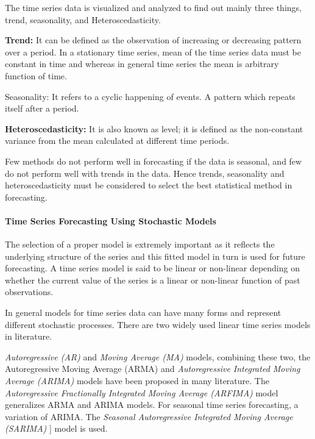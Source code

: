 \documentclass[
  letterpaper,
  DIV=11,
  numbers=noendperiod]{scrartcl}
\let\oldparagraph\paragraph
\renewcommand{\paragraph}[1]{\oldparagraph{#1}\mbox{}}
\begin{document}
The time series data is visualized and analyzed to find out mainly three
things, trend, seasonality, and Heteroscedasticity.

\textbf{Trend:} It can be defined as the observation of increasing or
decreasing pattern over a period. In a stationary time series, mean of
the time series data must be constant in time and whereas in general
time series the mean is arbitrary function of time.

Seasonality: It refers to a cyclic happening of events. A pattern which
repeats itself after a period.

\textbf{Heteroscedasticity:} It is also known as level; it is defined as
the non-constant variance from the mean calculated at different time
periods.

Few methods do not perform well in forecasting if the data is seasonal,
and few do not perform well with trends in the data. Hence trends,
seasonality and heteroscedasticity must be considered to select the best
statistical method in forecasting.

\hypertarget{time-series-forecasting-using-stochastic-models}{%
\paragraph{\texorpdfstring{\textbf{Time Series Forecasting Using
Stochastic
Models}}{Time Series Forecasting Using Stochastic Models}}\label{time-series-forecasting-using-stochastic-models}}

The selection of a proper model is extremely important as it reflects
the underlying structure of the series and this fitted model in turn is
used for future forecasting. A time series model is said to be linear or
non-linear depending on whether the current value of the series is a
linear or non-linear function of past observations.

In general models for time series data can have many forms and represent
different stochastic processes. There are two widely used linear time
series models in literature.

\emph{Autoregressive (AR)} and \emph{Moving Average (MA)} models,
combining these two, the Autoregressive Moving Average (ARMA) and
\emph{Autoregressive Integrated Moving Average (ARIMA)} models have been
proposed in many literature. The \emph{Autoregressive Fractionally
Integrated Moving Average (ARFIMA)} model generalizes ARMA and ARIMA
models. For seasonal time series forecasting, a variation of ARIMA. The
\emph{Seasonal Autoregressive Integrated Moving Average (SARIMA)} {]}
model is used.
\end{document}
